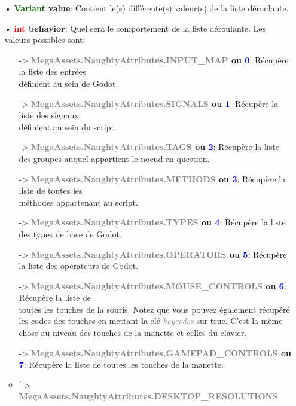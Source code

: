 \documentclass[a4paper, 11pt]{article}
\begin{document}
\begin{description}
\begin{itemize}
\begin{itemize}
				\begin{itemize}
				    \item[• \textbf{\textcolor{darkgreen}{Variant} value}:] Contient le(s) différente(s) 
				    valeur(s) de la liste déroulante.
				    \item[• \textbf{\textcolor{red}{int} behavior}:] Quel sera le comportement de la liste
				    déroulante. Les valeurs possibles sont:
				    \begin{itemize}
						\item[-> \textbf{\textcolor{gray}{MegaAssets.NaughtyAttributes.INPUT\_MAP} ou
						\textcolor{blue}{0}}:] Récupère la liste des entrées \\définient au sein de Godot.
						\item[-> \textbf{\textcolor{gray}{MegaAssets.NaughtyAttributes.SIGNALS} ou
						\textcolor{blue}{1}}:] Récupère la liste des signaux \\définient au sein du script.
						\item[-> \textbf{\textcolor{gray}{MegaAssets.NaughtyAttributes.TAGS} ou
						\textcolor{blue}{2}}:] Récupère la liste des groupes auquel appartient le noeud en
						question.
						\item[-> \textbf{\textcolor{gray}{MegaAssets.NaughtyAttributes.METHODS} ou 
						\textcolor{blue}{3}}:] Récupère la liste de toutes les \\méthodes appartenant au
						script.
						\item[-> \textbf{\textcolor{gray}{MegaAssets.NaughtyAttributes.TYPES} ou
						\textcolor{blue}{4}}:] Récupère la liste des types de base de Godot.
						\item[-> \textbf{\textcolor{gray}{MegaAssets.NaughtyAttributes.OPERATORS} ou
						\textcolor{blue}{5}}:] Récupère la liste des opérateurs de Godot.
						\item[-> \textbf{\textcolor{gray}{MegaAssets.NaughtyAttributes.MOUSE\_CONTROLS} ou 
						\textcolor{blue}{6}}:] Récupère la liste de \\toutes les touches de la souris. Notez 
						que vous pouvez également récupéré les codes des touches en mettant la clé 
						\textit{\textcolor{gray}{keycodes}} sur true. C'est la même chose au niveau des 
						touches de la manette et celles du clavier.
						\newpage \item[-> \textbf{\textcolor{gray}
						{MegaAssets.NaughtyAttributes.GAMEPAD\_CONTROLS}
						ou \textcolor{blue}{7}}:] Récupère la liste de toutes les touches de la manette.
						\item[-> \textbf{\textcolor{gray}{MegaAssets.NaughtyAttributes.DESKTOP\_RESOLUTIONS}
}
\end{itemize}
\end{itemize}
\end{itemize}
\end{itemize}
\end{description}
\end{document}

